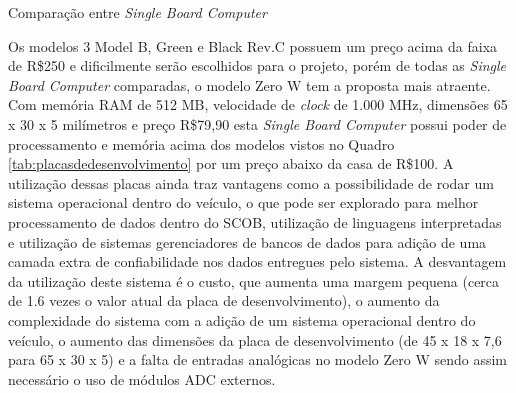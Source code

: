 \begin{table}[!htb]
	\centering
	\caption{Comparação entre \textit{Single Board Computer}}
	\label{tab:singleboard}
	\caption*{Fonte: Autor.}
\end{table}

Os modelos 3 Model B, Green e Black Rev.C possuem um preço acima da faixa de R\$250 e dificilmente serão escolhidos para o projeto, porém de todas as \textit{Single Board Computer} comparadas, o modelo Zero W tem a proposta mais atraente. Com memória RAM de 512 MB, velocidade de \textit{clock} de 1.000 MHz, dimensões 65 x 30 x 5 milímetros e preço R\$79,90 esta \textit{Single Board Computer} possui poder de processamento e memória acima dos modelos vistos no Quadro \ref{tab:placasdedesenvolvimento} por um preço abaixo da casa de R\$100. A utilização dessas placas ainda traz vantagens como a possibilidade de rodar um sistema operacional dentro do veículo, o que pode ser explorado para melhor processamento de dados dentro do SCOB, utilização de linguagens interpretadas e utilização de sistemas gerenciadores de bancos de dados para adição de uma camada extra de confiabilidade nos dados entregues pelo sistema. A desvantagem da utilização deste sistema é o custo, que aumenta uma margem pequena (cerca de 1.6 vezes o valor atual da placa de desenvolvimento), o aumento da complexidade do sistema com a adição de um sistema operacional dentro do veículo, o aumento das dimensões da placa de desenvolvimento (de 45 x 18 x 7,6 para 65 x 30 x 5) e a falta de entradas analógicas no modelo Zero W sendo assim necessário o uso de módulos ADC externos. 



